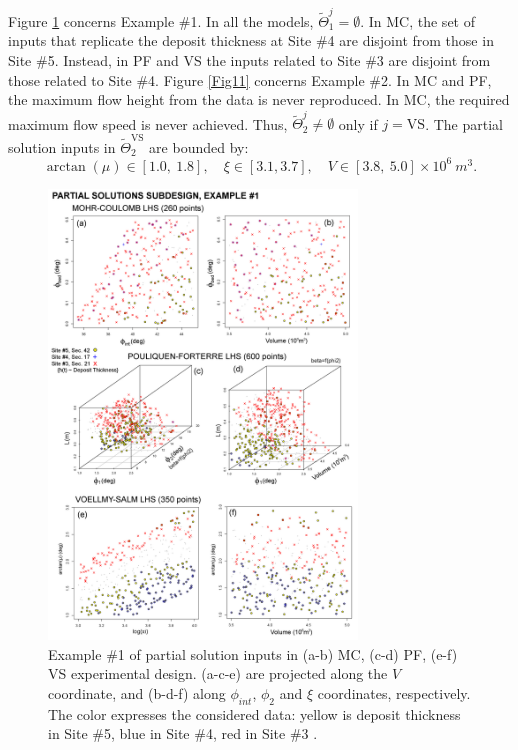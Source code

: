 \documentclass[nhess, manuscript]{copernicus}
\begin{document}
Figure \ref{Fig11_0} concerns Example \#1. In all the models, $\tilde\Theta_1^j=\emptyset$. In MC, the set of inputs that replicate the deposit thickness at Site \#4 are disjoint from those in Site \#5. Instead, in PF and VS the inputs related to Site \#3 are disjoint from those related to Site \#4. Figure \ref{Fig11} concerns Example \#2. In MC and PF, the  maximum flow height from the data is never reproduced. In MC, the required maximum flow speed is never achieved. Thus, $\tilde\Theta_2^j\neq\emptyset$ only if $j=\textrm{VS}$. The partial solution inputs in $\tilde\Theta_2^{\textrm{VS}}$ are bounded by:
$$\arctan(\mu) \in [1.0,\ 1.8],\quad \xi\in[3.1, 3.7],\quad V \in [3.8,\ 5.0] \times 10^6\ m^3.$$ 

\begin{figure}[H]
\centering
\includegraphics[width=0.73\textwidth]{Fig11_0.png}
\caption{Example \#1 of partial solution inputs in (a-b) MC, (c-d) PF, (e-f) VS experimental design. (a-c-e) are projected along the $V$ coordinate, and (b-d-f) along $\phi_{int}$, $\phi_2$ and $\xi$ coordinates, respectively. The color expresses the considered data: yellow is deposit thickness in Site \#5, blue in Site \#4, red in Site \#3 \citep{Saucedo2008}.}
\label{Fig11_0}
\end{figure}
\end{document}
